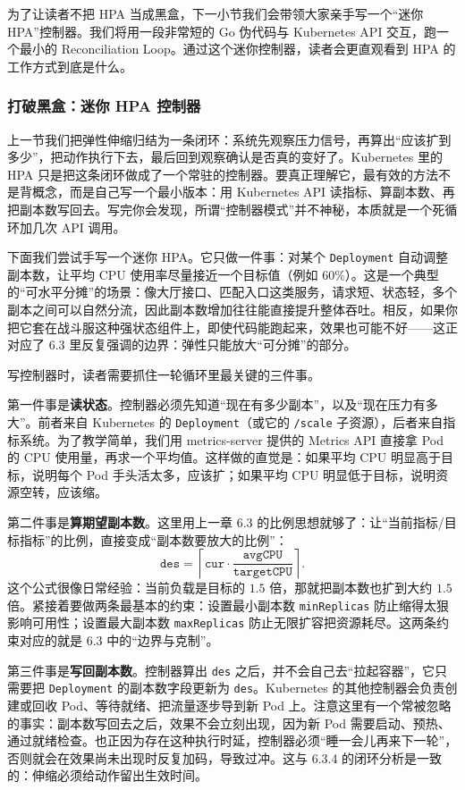 为了让读者不把 HPA 当成黑盒，下一小节我们会带领大家亲手写一个“迷你 HPA”控制器。我们将用一段非常短的 Go 伪代码与 Kubernetes API 交互，跑一个最小的 Reconciliation Loop。通过这个迷你控制器，读者会更直观看到 HPA 的工作方式到底是什么。

\subsubsection{打破黑盒：迷你 HPA 控制器}
上一节我们把弹性伸缩归结为一条闭环：系统先观察压力信号，再算出“应该扩到多少”，把动作执行下去，最后回到观察确认是否真的变好了。Kubernetes 里的 HPA 只是把这条闭环做成了一个常驻的控制器。要真正理解它，最有效的方法不是背概念，而是自己写一个最小版本：用 Kubernetes API 读指标、算副本数、再把副本数写回去。写完你会发现，所谓“控制器模式”并不神秘，本质就是一个死循环加几次 API 调用。

下面我们尝试手写一个迷你 HPA。它只做一件事：对某个 \texttt{Deployment} 自动调整副本数，让平均 CPU 使用率尽量接近一个目标值（例如 $60\%$）。这是一个典型的“可水平分摊”的场景：像大厅接口、匹配入口这类服务，请求短、状态轻，多个副本之间可以自然分流，因此副本数增加往往能直接提升整体吞吐。相反，如果你把它套在战斗服这种强状态组件上，即使代码能跑起来，效果也可能不好——这正对应了 6.3 里反复强调的边界：弹性只能放大“可分摊”的部分。

写控制器时，读者需要抓住一轮循环里最关键的三件事。

第一件事是\textbf{读状态}。控制器必须先知道“现在有多少副本”，以及“现在压力有多大”。前者来自 Kubernetes 的 \texttt{Deployment}（或它的 \texttt{/scale} 子资源），后者来自指标系统。为了教学简单，我们用 metrics-server 提供的 Metrics API 直接拿 Pod 的 CPU 使用量，再求一个平均值。这样做的直觉是：如果平均 CPU 明显高于目标，说明每个 Pod 手头活太多，应该扩；如果平均 CPU 明显低于目标，说明资源空转，应该缩。

第二件事是\textbf{算期望副本数}。这里用上一章 6.3 的比例思想就够了：让“当前指标/目标指标”的比例，直接变成“副本数要放大的比例”：
\[
\texttt{des}=\left\lceil \texttt{cur}\cdot\frac{\texttt{avgCPU}}{\texttt{targetCPU}}\right\rceil.
\]
这个公式很像日常经验：当前负载是目标的 $1.5$ 倍，那就把副本数也扩到大约 $1.5$ 倍。紧接着要做两条最基本的约束：设置最小副本数 \texttt{minReplicas} 防止缩得太狠影响可用性；设置最大副本数 \texttt{maxReplicas} 防止无限扩容把资源耗尽。这两条约束对应的就是 6.3 中的“边界与克制”。

第三件事是\textbf{写回副本数}。控制器算出 \texttt{des} 之后，并不会自己去“拉起容器”，它只需要把 \texttt{Deployment} 的副本数字段更新为 \texttt{des}。Kubernetes 的其他控制器会负责创建或回收 Pod、等待就绪、把流量逐步导到新 Pod 上。注意这里有一个常被忽略的事实：副本数写回去之后，效果不会立刻出现，因为新 Pod 需要启动、预热、通过就绪检查。也正因为存在这种执行时延，控制器必须“睡一会儿再来下一轮”，否则就会在效果尚未出现时反复加码，导致过冲。这与 6.3.4 的闭环分析是一致的：伸缩必须给动作留出生效时间。

